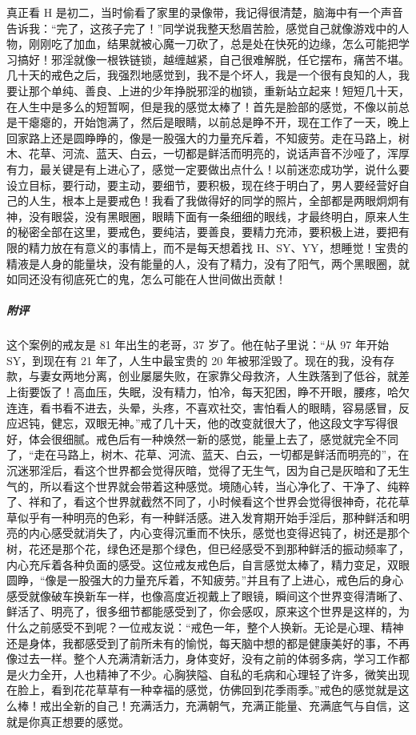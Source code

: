 \begin{case}
    真正看 H 是初二，当时偷看了家里的录像带，我记得很清楚，脑海中有一个声音告诉我：“完了，这孩子完了！”同学说我整天愁眉苦脸，感觉自己就像游戏中的人物，刚刚吃了加血，结果就被心魔一刀砍了，总是处在快死的边缘，怎么可能把学习搞好！邪淫就像一根铁链锁，越缠越紧，自己很难解脱，任它摆布，痛苦不堪。几十天的戒色之后，我强烈地感觉到，我不是个坏人，我是一个很有良知的人，我要让那个单纯、善良、上进的少年挣脱邪淫的枷锁，重新站立起来！短短几十天，在人生中是多么的短暂啊，但是我的感觉太棒了！首先是脸部的感觉，不像以前总是干瘪瘪的，开始饱满了，然后是眼睛，以前总是睁不开，现在工作了一天，晚上回家路上还是圆睁睁的，像是一股强大的力量充斥着，不知疲劳。走在马路上，树木、花草、河流、蓝天、白云，一切都是鲜活而明亮的，说话声音不沙哑了，浑厚有力，最关键是有上进心了，感觉一定要做出点什么！以前迷恋成功学，说什么要设立目标，要行动，要主动，要细节，要积极，现在终于明白了，男人要经营好自己的人生，根本上是要戒色！我看了我做得好的同学的照片，全部都是两眼炯炯有神，没有眼袋，没有黑眼圈，眼睛下面有一条细细的眼线，才最终明白，原来人生的秘密全部在这里，要戒色，要纯洁，要善良，要精力充沛，要积极上进，要把有限的精力放在有意义的事情上，而不是每天想着找 H、SY、YY，想睡觉！宝贵的精液是人身的能量块，没有能量的人，没有了精力，没有了阳气，两个黑眼圈，就如同还没有彻底死亡的鬼，怎么可能在人世间做出贡献！
    \subparagraph{附评} 这个案例的戒友是 81 年出生的老哥，37 岁了。他在帖子里说：“从 97 年开始 SY，到现在有 21 年了，人生中最宝贵的 20 年被邪淫毁了。现在的我，没有存款，与妻女两地分离，创业屡屡失败，在家靠父母救济，人生跌落到了低谷，就差上街要饭了！高血压，失眠，没有精力，怕冷，每天犯困，睁不开眼，腰疼，哈欠连连，看书看不进去，头晕，头疼，不喜欢社交，害怕看人的眼睛，容易感冒，反应迟钝，健忘，双眼无神。”戒了几十天，他的改变就很大了，他这段文字写得很好，体会很细腻。戒色后有一种焕然一新的感觉，能量上去了，感觉就完全不同了，“走在马路上，树木、花草、河流、蓝天、白云，一切都是鲜活而明亮的”，在沉迷邪淫后，看这个世界都会觉得灰暗，觉得了无生气，因为自己是灰暗和了无生气的，所以看这个世界就会带着这种感觉。境随心转，当心净化了、干净了、纯粹了、祥和了，看这个世界就截然不同了，小时候看这个世界会觉得很神奇，花花草草似乎有一种明亮的色彩，有一种鲜活感。进入发育期开始手淫后，那种鲜活和明亮的内心感受就消失了，内心变得沉重而不快乐，感觉也变得迟钝了，树还是那个树，花还是那个花，绿色还是那个绿色，但已经感受不到那种鲜活的振动频率了，内心充斥着各种负面的感受。这位戒友戒色后，自言感觉太棒了，精力变足，双眼圆睁，“像是一股强大的力量充斥着，不知疲劳。”并且有了上进心，戒色后的身心感受就像破车换新车一样，也像高度近视戴上了眼镜，瞬间这个世界变得清晰了、鲜活了、明亮了，很多细节都能感受到了，你会感叹，原来这个世界是这样的，为什么之前感受不到呢？一位戒友说：“戒色一年，整个人换新。无论是心理、精神还是身体，我都感受到了前所未有的愉悦，每天脑中想的都是健康美好的事，不再像过去一样。整个人充满清新活力，身体变好，没有之前的体弱多病，学习工作都是火力全开，人也精神了不少。心胸狭隘、自私的毛病和心理轻了许多，微笑出现在脸上，看到花花草草有一种幸福的感觉，仿佛回到花季雨季。”戒色的感觉就是这么棒！戒出全新的自己！充满活力，充满朝气，充满正能量、充满底气与自信，这就是你真正想要的感觉。


\end{case}
